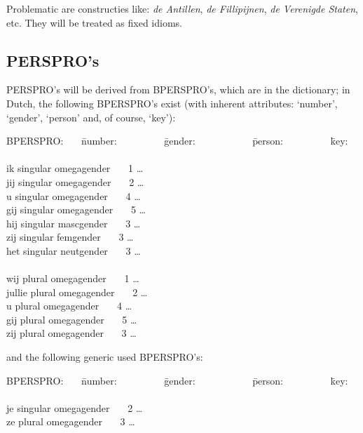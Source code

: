 Problematic are constructies like: {\em de Antillen}, {\em de Fillipijnen},
{\em de Verenigde Staten}, etc. They will be treated as fixed idioms.



\subsection{PERSPRO's}

PERSPRO's will be derived from BPERSPRO's, which are in the dictionary; in 
Dutch, the following BPERSPRO's exist (with inherent attributes: `number', 
`gender', `person' and, of course, `key'):

\begin{tabbing}
BPERSPRO: \ \ \  \= number: \ \ \ \ \ \ \ \ \  \= gender:  
 \ \ \ \ \ \ \ \ \ \ \    \= person: \ \  \ \ \ \ \ \ \  \= key: \\
          \>          \>            \>         \>      \\
ik        \> singular \> omegagender \> \ \ \  1 \>    \ldots \\
jij       \> singular \> omegagender \> \ \ \  2 \>    \ldots \\
u         \> singular \> omegagender \> \ \ \  4 \>    \ldots \\
gij       \> singular \> omegagender \> \ \ \  5 \>    \ldots \\
hij       \> singular \> mascgender  \> \ \ \  3 \>    \ldots \\
zij       \> singular \> femgender   \> \ \ \  3 \>    \ldots \\
het       \> singular \> neutgender  \> \ \ \  3 \>    \ldots \\
          \>          \>            \>         \>      \\
wij       \> plural \>  omegagender \> \ \ \  1 \>     \ldots \\
jullie    \> plural \>  omegagender \> \ \ \  2 \>     \ldots \\
u         \> plural \>  omegagender \> \ \ \  4 \>     \ldots \\
gij       \> plural \>  omegagender \> \ \ \  5 \>     \ldots \\
zij       \> plural \>  omegagender \> \ \ \  3 \>     \ldots \\
\end{tabbing}

and the following generic used BPERSPRO's:

\begin{tabbing}
BPERSPRO: \ \ \  \= number: \ \ \ \ \ \ \ \ \  \= gender:  
 \ \ \ \ \ \ \ \ \ \ \    \= person: \ \  \ \ \ \ \ \ \  \= key: \\
          \>          \>            \>         \>      \\
je        \> singular \>  omegagender \> \ \ \  2 \>      \ldots \\ 
ze        \> plural   \>  omegagender \> \ \ \  3 \>      \ldots \\ 
\end{tabbing}


